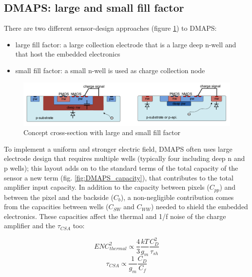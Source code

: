    \subsection{DMAPS: large and small fill factor}\label{sec:small-large-fill-factor}
      There are two different sensor-design approaches (figure \ref{fig:large_small_sensor_scheme})
      to DMAPS:
      \begin{itemize}
         \item large fill factor: a large collection electrode that is a large deep n-well
      and that host the embedded electronics
         \item small fill factor: a small n-well is used as charge collection node
      \end{itemize}
      \begin{figure}
         \centering\includegraphics[width=12cm]{figures/Pixel_detectors/large_small_sensor_scheme.png}
         \caption{Concept cross-section with large and small fill factor}
         \label{fig:large_small_sensor_scheme}
      \end{figure}
      To implement a uniform and stronger electric field, DMAPS often uses large electrode design that requires multiple wells (typically four including deep n and p wells); this layout adds on to the standard terms of the total capacity of the sensor a new term (fig. \ref{fig:DMAPS_capacity}), that contributes to the total amplifier input capacity. In addition to the capacity between pixels ($C_{pp}$) and between the pixel and the backside ($C_{b}$), a non-negligible contribution comes from the capacities between wells ($C_{SW}$ and $C_{WW}$) needed to shield the embedded electronics. These capacities affect the thermal and 1/f noise of the charge amplifier and the $ \tau_{CSA}$ too:
      \begin{multicols}{2}
         \begin{equation}
            ENC^2 _ {thermal} \propto \frac{4}{3}\frac{kT}{g_m}\frac{C_D ^2}{\tau_{sh}}
         \end{equation}\quad 
         \begin{equation}
            \tau_{CSA} \propto \frac{1}{g_m}\frac{C_D}{C_f}
         \end{equation}
      \end{multicols} 
